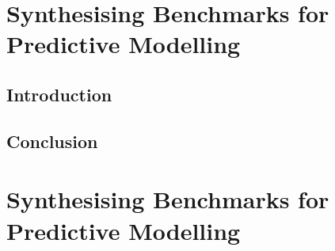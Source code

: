 \ifstapled
\chapter{Synthesising Benchmarks for Predictive Modelling}
\section{Introduction}
\lipsum[1-2]

\section{Conclusion}
\lipsum[1-2]
\else
\chapter{Synthesising Benchmarks for Predictive Modelling}
\label{chap:clgen}









\fi
